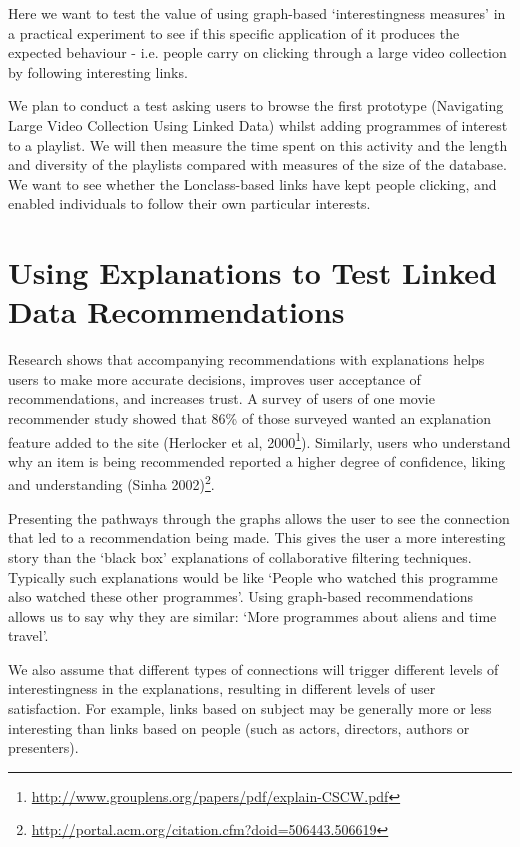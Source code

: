 \documentclass{notube}
\begin{document}
Here we want to test the value of using graph-based `interestingness measures' in a practical experiment to see if this specific application of it produces the expected behaviour - i.e. people carry on clicking through a large video collection by following interesting links.

We plan to conduct a test asking users to browse the first prototype (Navigating Large Video Collection Using Linked Data) whilst adding programmes of interest to a playlist. We will then measure the time spent on this activity and the length and diversity of the playlists compared with measures of the size of the database. We want to see whether the Lonclass-based links have kept people clicking, and enabled individuals to follow their own particular interests.

\section{Using Explanations to Test Linked Data Recommendations}

Research shows that accompanying recommendations with explanations helps users to make more accurate decisions, improves user acceptance of recommendations, and increases trust. A survey of users of one movie recommender study showed that 86\% of those surveyed wanted an explanation feature added to the site (Herlocker et al, 2000\footnote{\url{http://www.grouplens.org/papers/pdf/explain-CSCW.pdf}}). Similarly, users who understand why an item is being recommended reported a higher degree of confidence, liking and understanding (Sinha 2002)\footnote{\url{http://portal.acm.org/citation.cfm?doid=506443.506619}}.

Presenting the pathways through the graphs allows the user to see the connection that led to a recommendation being made. This gives the user a more interesting story than the `black box' explanations of collaborative filtering techniques. Typically such explanations would be like `People who watched this programme also watched these other programmes'. Using graph-based recommendations allows us to say why they are similar: `More programmes about aliens and time travel'. 

We also assume that different types of connections will trigger different levels of interestingness in the explanations, resulting in different levels of user satisfaction. For example, links based on subject may be generally more or less interesting than links based on people (such as actors, directors, authors or presenters).
\end{document}
